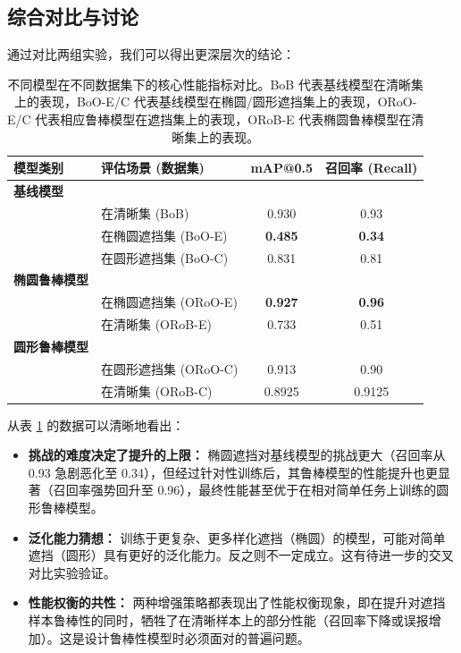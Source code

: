 \documentclass[12pt, a4paper]{report}
\begin{document}
\begin{minipage}{\textwidth}
\subsection{综合对比与讨论}
通过对比两组实验，我们可以得出更深层次的结论：
\begin{table}[H]
    \centering
    \caption{不同模型在不同数据集下的核心性能指标对比。BoB 代表基线模型在清晰集上的表现，BoO-E/C 代表基线模型在椭圆/圆形遮挡集上的表现，ORoO-E/C 代表相应鲁棒模型在遮挡集上的表现，ORoB-E 代表椭圆鲁棒模型在清晰集上的表现。}
    \label{tab:main_results}
    \begin{tabular}{llcc}
        \toprule
        \textbf{模型类别} & \textbf{评估场景 (数据集)} & \textbf{mAP@0.5} & \textbf{召回率 (Recall)} \\
        \midrule
        \textbf{基线模型} & & & \\
        & 在清晰集 (BoB) & 0.930 & 0.93 \\
        & 在椭圆遮挡集 (BoO-E) & \textbf{0.485} & \textbf{0.34} \\
        & 在圆形遮挡集 (BoO-C) & 0.831 & 0.81 \\
        \midrule
        \textbf{椭圆鲁棒模型} & & & \\
        & 在椭圆遮挡集 (ORoO-E) & \textbf{0.927} & \textbf{0.96} \\
        & 在清晰集 (ORoB-E) & 0.733 & 0.51 \\
        \midrule
        \textbf{圆形鲁棒模型} & & & \\
        & 在圆形遮挡集 (ORoO-C) & 0.913 & 0.90 \\
        & 在清晰集 (ORoB-C) & 0.8925 & 0.9125 \\
        \bottomrule
    \end{tabular}
\end{table}

从表 \ref{tab:main_results} 的数据可以清晰地看出：
\begin{itemize}
    \item \textbf{挑战的难度决定了提升的上限：} 椭圆遮挡对基线模型的挑战更大（召回率从 0.93 急剧恶化至 0.34），但经过针对性训练后，其鲁棒模型的性能提升也更显著（召回率强势回升至 0.96），最终性能甚至优于在相对简单任务上训练的圆形鲁棒模型。
    \item \textbf{泛化能力猜想：} 训练于更复杂、更多样化遮挡（椭圆）的模型，可能对简单遮挡（圆形）具有更好的泛化能力。反之则不一定成立。这有待进一步的交叉对比实验验证。
    \item \textbf{性能权衡的共性：} 两种增强策略都表现出了性能权衡现象，即在提升对遮挡样本鲁棒性的同时，牺牲了在清晰样本上的部分性能（召回率下降或误报增加）。这是设计鲁棒性模型时必须面对的普遍问题。
\end{itemize}
\end{minipage}
\end{document}

